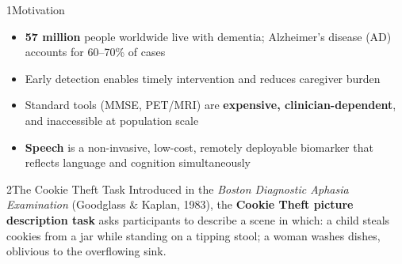 \documentclass[final]{beamer}
\newlength{\leftcol}
\newlength{\blockskip}
\begin{document}
\begin{frame}[t]

\vspace{1.8cm}

\begin{columns}[T, totalwidth=\linewidth]

\begin{column}{\leftcol}

\begin{block}{1\enspace Motivation}
\justifying
\begin{itemize}[leftmargin=1.4em, itemsep=0.35em, topsep=0pt]
  \item \textbf{57 million} people worldwide live with dementia;
        Alzheimer's disease (AD) accounts for 60--70\% of cases
  \item Early detection enables timely intervention and reduces caregiver burden
  \item Standard tools (MMSE, PET/MRI) are \textbf{expensive,
        clinician-dependent}, and inaccessible at population scale
  \item \textbf{Speech} is a non-invasive, low-cost, remotely deployable biomarker
        that reflects language and cognition simultaneously
\end{itemize}
\vspace{0.6em}
\begin{center}
\end{center}
\end{block}

\vspace{\blockskip}

\begin{block}{2\enspace The Cookie Theft Task}
\justifying
Introduced in the \textit{Boston Diagnostic Aphasia Examination}
(Goodglass \& Kaplan, 1983), the \textbf{Cookie Theft picture
description task} asks participants to describe a scene in which:
a child steals cookies from a jar while standing on a tipping stool;
a woman washes dishes, oblivious to the overflowing sink.


\end{block}
\end{column}
\end{columns}
\end{frame}
\end{document}
